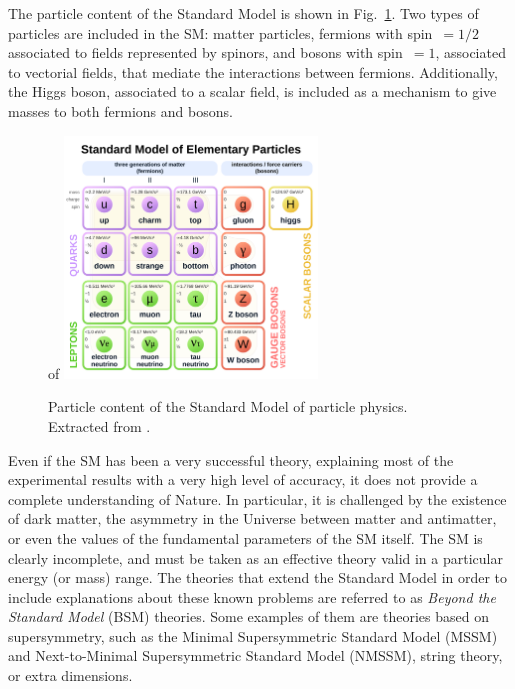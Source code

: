 \documentclass[../main.tex]{subfiles}
\begin{document}
The particle content of the Standard Model is shown in Fig.~\ref{theo:fig:sm}. Two types of particles are included in the SM: matter particles, fermions with spin~$=1/2$ associated to fields represented by spinors, and bosons with spin~$=1$, associated to vectorial fields, that mediate the interactions between fermions. Additionally, the Higgs boson, associated to a scalar field, is included as a mechanism to give masses to both fermions and bosons.

\begin{figure}[h!]
\begin{center}
of \includegraphics[width=0.6\textwidth]{Images/Standard_Model_of_Elementary_Particles}
\end{center}
\caption[Particle content of the Standard Model of particle physics]{Particle content of the Standard Model of particle physics. Extracted from \cite{intro:theo:sm_pic}. }
\label{theo:fig:sm}
\end{figure}

Even if the SM has been a very successful theory, explaining most of the experimental results with a very high level of accuracy, it does not provide a complete understanding of Nature. In particular, it is challenged by the existence of dark matter, the asymmetry in the Universe between matter and antimatter, or even the values of the fundamental parameters of the SM itself. The SM is clearly incomplete, and must be taken as an effective theory valid in a particular energy (or mass) range. The theories that extend the Standard Model in order to include explanations about these known problems are referred to as \textit{Beyond the Standard Model} (BSM) theories. Some examples of them are theories based on supersymmetry, such as the Minimal Supersymmetric Standard Model (MSSM) and Next-to-Minimal Supersymmetric Standard Model (NMSSM), string theory, or extra dimensions.
\end{document}
